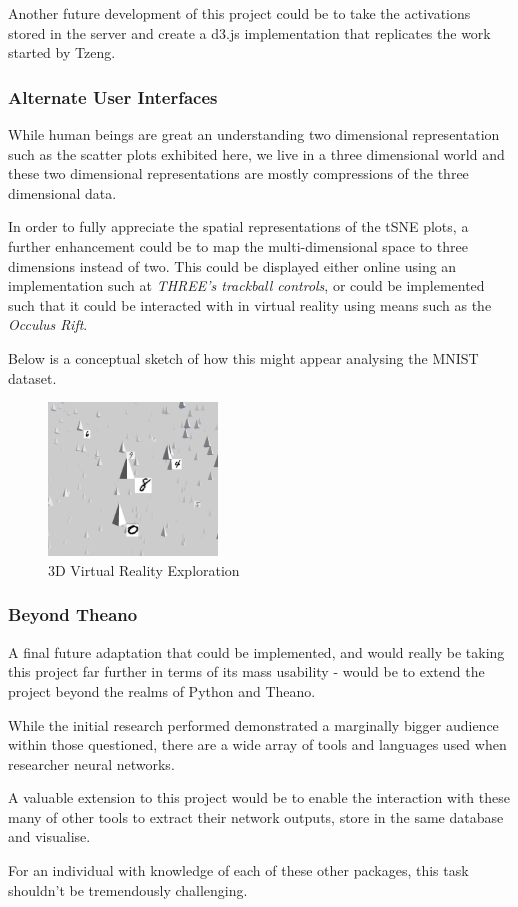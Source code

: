 \documentclass[a4paper,11pt,titlepage]{article}
\begin{document}
	Another future development of this project could be to take the activations stored in the server and create a d3.js implementation that replicates the work started by Tzeng.
	
	\subsubsection{Alternate User Interfaces}	
	While human beings are great an understanding two dimensional representation such as the scatter plots exhibited here, we live in a three dimensional world and these two dimensional representations are mostly compressions of the three dimensional data.
	\par 
	In order to fully appreciate the spatial representations of the tSNE plots, a further enhancement could be to map the multi-dimensional space to three dimensions instead of two. This could be displayed either online using an implementation such at \textit{THREE's trackball controls}, or could be implemented such that it could be interacted with in virtual reality using means such as the \textit{Occulus Rift}.
	\par 
	Below is a conceptual sketch of how this might appear analysing the MNIST dataset.
		
	\begin{figure}[H]
		\centering 
    		\includegraphics[width=0.4\textwidth]{img/occulus_rift.png} 
    		\caption{3D Virtual Reality Exploration}%
 	\end{figure}
		
	\subsubsection{Beyond Theano}
	A final future adaptation that could be implemented, and would really be taking this project far further in terms of its mass usability - would be to extend the project beyond the realms of Python and Theano.
	\par 
	While the initial research performed demonstrated a marginally bigger audience within those questioned, there are a wide array of tools and languages used when researcher neural networks. 
	\par 
	A valuable extension to this project would be to enable the interaction with these many of other tools to extract their network outputs, store in the same database and visualise. 
	\par 
	For an individual with knowledge of each of these other packages, this task shouldn't be tremendously challenging.
	
\end{document}
